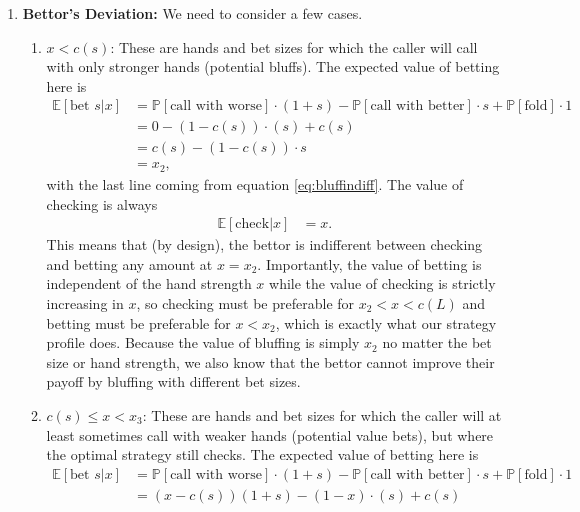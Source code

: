 \documentclass[../../main/main.tex]{subfiles}
\begin{document}
\begin{customproof}
\begin{enumerate}
        \item \textbf{Bettor's Deviation:}
            We need to consider a few cases.
            \begin{enumerate}
                \item $x < c(s)$:
                    These are hands and bet sizes for which the caller will call with only stronger hands (potential bluffs). The expected value of betting here is
                    \begin{align*}
                        \mathbb{E}[\text{bet } s | x] & = \mathbb{P}[\text{call with worse}] \cdot (1+s) - \mathbb{P}[\text{call with better}] \cdot s + \mathbb{P}[\text{fold}] \cdot 1 \\
                        & = 0 - (1-c(s)) \cdot (s) + c(s) \\
                        & = c(s) - (1-c(s)) \cdot s \\
                        & = x_2,
                    \end{align*}
                    with the last line coming from equation \ref{eq:bluffindiff}. The value of checking is always
                    \begin{align*}
                        \mathbb{E}[\text{check} | x] &= x.
                    \end{align*}
                    This means that (by design), the bettor is indifferent between checking and betting any amount at $x=x_2$. Importantly, the value of betting is independent of the hand strength $x$ while the value of checking is strictly increasing in $x$, so checking must be preferable for $x_2 < x < c(L)$ and betting must be preferable for $x < x_2$, which is exactly what our strategy profile does.
                    Because the value of bluffing is simply $x_2$ no matter the bet size or hand strength, we also know that the bettor cannot improve their payoff by bluffing with different bet sizes.
                \item $c(s) \leq x < x_3$:
                    These are hands and bet sizes for which the caller will at least sometimes call with weaker hands (potential value bets), but where the optimal strategy still checks. The expected value of betting here is
                    \begin{align*}
                        \mathbb{E}[\text{bet } s | x] & = \mathbb{P}[\text{call with worse}] \cdot (1+s) - \mathbb{P}[\text{call with better}] \cdot s + \mathbb{P}[\text{fold}] \cdot 1 \\
                        & = (x-c(s))(1+s) - (1-x) \cdot (s) + c(s) \\

\end{align*}
\end{enumerate}
\end{enumerate}
\end{customproof}
\end{document}
